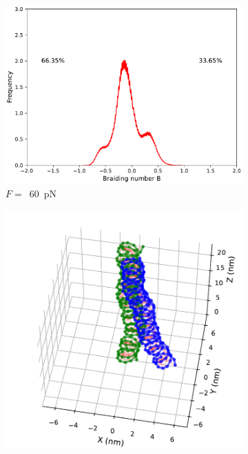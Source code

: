 \documentclass[a4paper,10pt]{article}
\begin{document}
\begin{figure}[tb]
\begin{subfigure}{.3\textwidth}
\includegraphics[width=\textwidth]{brF_60_br_pr.pdf}
\caption{$F=$~\SI{60}{\pico\newton}}
\label{fig:braF_b}
\end{subfigure}
\begin{subfigure}{.3\textwidth}
\includegraphics[width=\textwidth]{brF_100_2000000.pdf}

\end{subfigure}
\end{figure}
\end{document}

